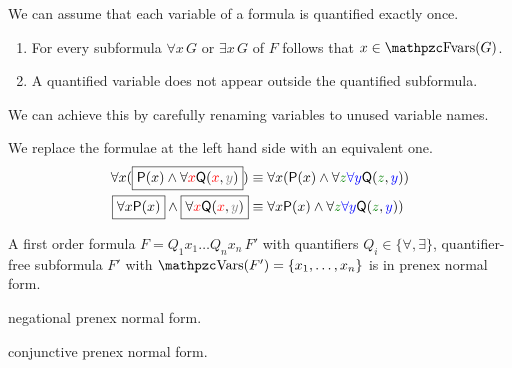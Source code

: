 
\noindent We can assume that each variable of a formula is quantified exactly once. 
\begin{enumerate}
	\item For every subformula $\forall x\, G$ or $\exists x\, G$ of $F$ follows that $x\in\fvar(G)$.
	\item A quantified variable does not appear outside the quantified subformula.
\end{enumerate}
We can achieve this by carefully renaming variables to unused variable names.

\begin{example}We replace the formulae at the left hand side with an equivalent one.
	\begin{align*}
	\forall x (\boxed{\mP(x) \land \forall {\colLo x} \mQ({\colLo x}, {\colG y})}) 
	&\equiv 
	\forall x (\mP(x) \land \forall {\colHi z}{\colN \forall y} \mQ({\colHi z}, {\colN y}))
	\\
	\boxed{\forall x \mP(x)} \land \boxed{\forall {\colLo x} \mQ({\colLo x}, {\colG y})} 
	&\equiv 
	\forall x \mP(x) \land \forall {\colHi z}{\colN \forall y} \mQ({\colHi z}, {\colN y}) 
	)\\
	\end{align*}
\end{example}

\begin{definition}\label{def:syntax:PNF}
	A first order formula $F = Q_1 x_1 \ldots Q_n x_n\, F'$ 
	with quantifiers $Q_i\in\{\forall,\exists\}$, 
	quantifier-free subformula $F'$ with $\var(F') = \{ x_1,\ldots,x_n \}$
	is in {\myem prenex normal form}.
\end{definition}

\begin{definition}\label{def:syntax:PNF}
	{\myem negational prenex normal form}.
\end{definition}

\begin{definition}\label{def:syntax:PNF}
	{\myem conjunctive prenex normal form}.
\end{definition}

